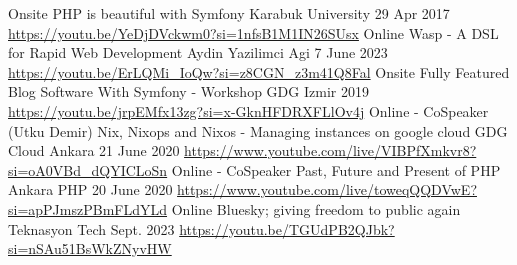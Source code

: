 
\begin{cventries}

    \cventry
    {Onsite} %
    {PHP is beautiful with Symfony} %
    {Karabuk University} %
    {29 Apr 2017} %
    {
      \url{https://youtu.be/YeDjDVckwm0?si=1nfsB1M1IN26SUsx}
    }
    \vspace{0.5cm}
    \cventry
    {Online} %
    {Wasp - A DSL for Rapid Web Development} %
    {Aydin Yazilimci Agi} %
    {7 June 2023} %
    {
      \url{https://youtu.be/ErLQMi_IoQw?si=z8CGN_z3m41Q8Fal}
    }
    \vspace{0.5cm}
    \cventry
    {Onsite} %
    {Fully Featured Blog Software With Symfony - Workshop} %
    {GDG Izmir} %
    {2019} %
    {
      \url{https://youtu.be/jrpEMfx13zg?si=x-GknHFDRXFLlOv4j}
    }
    \vspace{0.5cm}
    \cventry
    {Online - CoSpeaker (Utku Demir)} %
    {Nix, Nixops and Nixos -  Managing instances on google cloud } %
    {GDG Cloud Ankara} %
    {21 June 2020} %
    {
      \url{https://www.youtube.com/live/VIBPfXmkvr8?si=oA0VBd_dQYICLoSn}
    }
    \vspace{0.5cm}
    \cventry
    {Online - CoSpeaker} %
    {Past, Future and Present of PHP} %
    {Ankara PHP} %
    {20 June 2020} %
    {
      \url{https://www.youtube.com/live/toweqQQDVwE?si=apPJmszPBmFLdYLd}
    }
    \vspace{0.5cm}
    \cventry
    {Online } %
    {Bluesky; giving freedom to public again} %
    {Teknasyon Tech} %
    {Sept. 2023} %
    {
      \url{https://youtu.be/TGUdPB2QJbk?si=nSAu51BsWkZNyvHW}
    }
    \cventry

\end{cventries}
